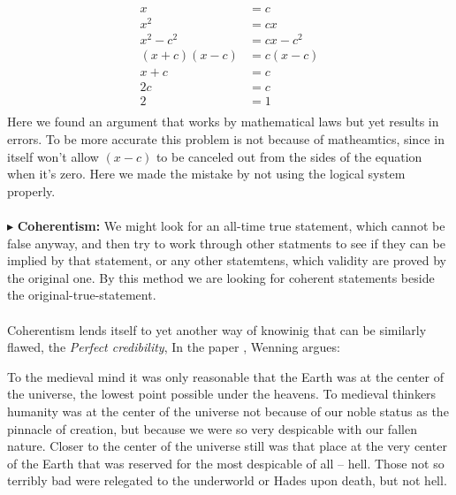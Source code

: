 \documentclass[9pt,a4paper,twocolumn]{article}
\newcommand{\newpoint}[1]{\indent$\blacktriangleright$ \textbf{#1}}
\begin{document}
            \begin{align*}
                x &=c \\
                x^2 &= cx\\
                x^2 - c^2 &= cx - c^2\\
                (x+c)(x-c) &= c(x-c)\\
                x + c &= c \\
                2c &= c \\ 
                2 &=1 \\ 
            \end{align*}
            Here we found an argument that works by mathematical laws but yet results in errors. To be more accurate this problem is not because of matheamtics, since in itself won't allow $(x-c)$ to be canceled out from the sides of the equation when it's zero. Here we made the mistake by not using the logical system properly. \cite{CW/E}
            \\
            \\
            \newpoint{Coherentism:} We might look for an all-time true statement, which cannot be false anyway, and then try to work through other statments to see if they can be implied by that statement, or any other statemtens, which validity are proved by the original one. By this method we are looking for coherent statements beside the original-true-statement. 
            \\
            \\
            Coherentism lends itself to yet another way of knowinig that can be similarly flawed, the \textit{Perfect credibility}, In the paper \cite{CW/E}, Wenning argues:
            \begin{qt}
                To the medieval mind it was only reasonable that the Earth was at the center of the universe, the lowest point possible under the heavens. To medieval thinkers humanity was at the center of the universe not because of our noble status as the pinnacle of creation, but because we were so very despicable with our fallen nature. Closer to the center of the universe still was that place at the very center of the Earth that was reserved for the most despicable of all – hell. Those not so terribly bad were relegated to the underworld or Hades upon death, but not hell.
            \end{qt}
\end{document}
